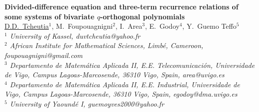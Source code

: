 \documentclass[11pt]{article}
\begin{document}
%
\vspace{-0.8cm}
\begin{flushleft}
\Large \textbf{\noindent
Divided-difference equation and three-term recurrence relations  of some systems of bivariate $q$-orthogonal polynomials}
\\
\vspace{0.5cm}
\normalsize
\normalsize{
 \underline{D.D.~Tcheutia}$^1$,  M.~Foupouagnigni$^2$,  I.~Area$^3$,  E.~Godoy$^4$,  Y.~Guemo  Teffo$^5$
} \\
\vspace{5mm}
\textit{\footnotesize
$^1$ University of Kassel,
duvtcheutia@yahoo.fr\\
$^2$ African Institute for Mathematical Sciences, Limb\'{e}, Cameroon,
foupouagnigni@gmail.com\\
$^3$ Departamento de Matem\'atica Aplicada II, E.E. Telecomunicaci\'on, Universidade de Vigo, Campus Lagoas-Marcosende, 36310 Vigo, Spain,
area@uvigo.es\\
$^4$ Departamento de Matem\'atica Aplicada II,  E.E. Industrial, Universidade de Vigo, Campus Lagoas-Marcosende,   36310 Vigo, Spain,
egodoy@dma.uvigo.es\\
$^5$ University of Yaound\'{e} I,
guemoyves2000@yahoo.fr\\
}
\end{flushleft}
\end{document}
